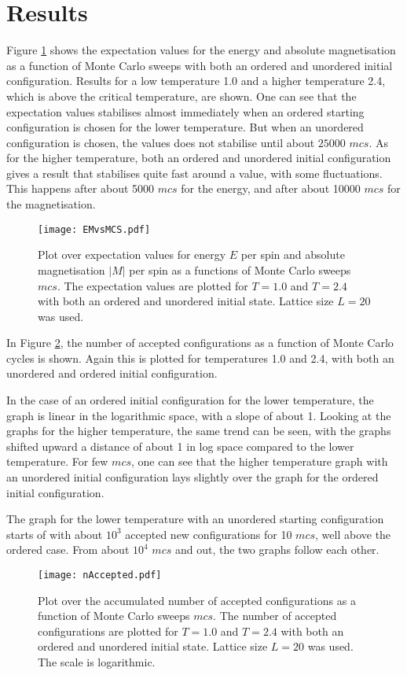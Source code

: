 \section{Results}
\label{sec:results}
Figure \ref{fig:EMvsMCS} shows the expectation values for the energy and absolute magnetisation as a function of Monte Carlo sweeps with both an ordered and unordered initial configuration. Results for a low temperature 1.0 and a higher temperature 2.4, which is above the critical temperature, are shown. One can see that the expectation values stabilises almost immediately when an ordered starting configuration is chosen for the lower temperature. But when an unordered configuration is chosen, the values does not stabilise until about $25000$ $mcs$. As for the higher temperature, both an ordered and unordered initial configuration gives a result that stabilises quite fast around a value, with some fluctuations. This happens after about 5000 $mcs$ for the energy, and after about 10000 $mcs$ for the magnetisation.   
\begin{figure}[htbp]
	\centering
	\texttt{[image: EMvsMCS.pdf]}
	\caption{Plot over expectation values for energy $E$ per spin and absolute magnetisation $|M|$ per spin as a functions of Monte Carlo sweeps $mcs$. The expectation values are plotted for $T=1.0$ and $T=2.4$ with both an ordered and unordered initial state. Lattice size $L=20$ was used.}
	\label{fig:EMvsMCS}
\end{figure}

In Figure \ref{fig:nAccepted}, the number of accepted configurations as a function of Monte Carlo cycles is shown. Again this is plotted for temperatures 1.0 and 2.4, with both an unordered and ordered initial configuration. 

In the case of an ordered initial configuration for the lower temperature, the graph is linear in the logarithmic space, with a slope of about 1. Looking at the graphs for the higher temperature, the same trend can be seen, with the graphs shifted upward a distance of about 1 in log space compared to the lower temperature. For few $mcs$, one can see that the higher temperature graph with an unordered initial configuration lays slightly over the graph for the ordered initial configuration. 

The graph for the lower temperature with an unordered starting configuration starts of with about $10^3$ accepted new configurations for 10 $mcs$, well above the ordered case. From about $10^4$ $mcs$ and out, the two graphs follow each other. 
\begin{figure}[htbp]
	\centering
	\texttt{[image: nAccepted.pdf]}
	\caption{Plot over the accumulated number of accepted configurations as a function of Monte Carlo sweeps $mcs$. The number of accepted configurations are plotted for $T=1.0$ and $T=2.4$ with both an ordered and unordered initial state. Lattice size $L=20$ was used. The scale is logarithmic.}
	\label{fig:nAccepted}
\end{figure}

